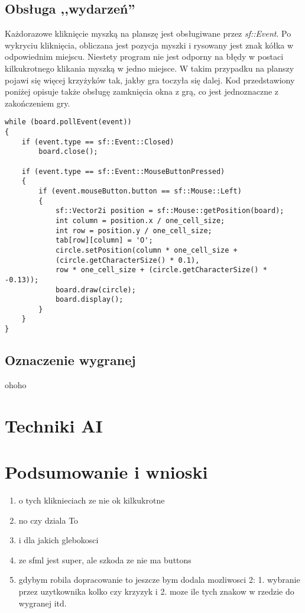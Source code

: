 \documentclass[12pt]{article}
\begin{document}
\subsection{Obsługa ,,wydarzeń''}

Każdorazowe kliknięcie myszką na planszę jest obsługiwane przez \textit{sf::Event}. Po wykryciu kliknięcia, obliczana jest pozycja myszki i rysowany jest znak kółka w odpowiednim miejscu. Niestety program nie jest odporny na błędy w postaci kilkukrotnego klikania myszką w jedno miejsce. W takim przypadku na planszy pojawi się więcej krzyżyków tak, jakby gra toczyła się dalej. Kod przedstawiony poniżej opisuje także obsługę zamknięcia okna z grą, co jest jednoznaczne z zakończeniem gry.

\begin{lstlisting}
while (board.pollEvent(event))
{
    if (event.type == sf::Event::Closed)
        board.close();

    if (event.type == sf::Event::MouseButtonPressed)
    {
        if (event.mouseButton.button == sf::Mouse::Left)
        {
            sf::Vector2i position = sf::Mouse::getPosition(board);
            int column = position.x / one_cell_size;
            int row = position.y / one_cell_size;
            tab[row][column] = 'O';
            circle.setPosition(column * one_cell_size + 
            (circle.getCharacterSize() * 0.1), 
            row * one_cell_size + (circle.getCharacterSize() * -0.13));       
            board.draw(circle);
            board.display();
        }
    }
}

\end{lstlisting}


\subsection{Oznaczenie wygranej}

\colorbox{WildStrawberry}{ohoho}

\section{Techniki AI}

\section{Podsumowanie i wnioski}
\begin{enumerate}
    \item o tych kliknieciach ze nie ok kilkukrotne
    \item no czy dziala To
    \item i dla jakich glebokosci
    \item ze sfml jest super, ale szkoda ze nie ma buttons
    \item gdybym robila dopracowanie to jeszcze bym dodala mozliwosci 2: 1. wybranie przez uzytkownika kolko czy krzyzyk i 2. moze ile tych znakow w rzedzie do wygranej itd.
\end{enumerate}
\end{document}
